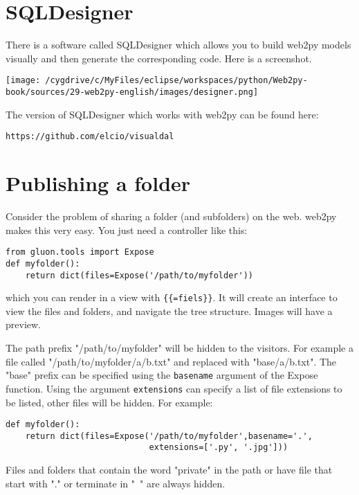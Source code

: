\documentclass[justified,sixbynine,notoc]{tufte-book}
\def\ft{\small\tt}
\begin{document}
\begin{fullwidth}
\goodbreak\section{SQLDesigner}

There is a software called SQLDesigner which allows you to build web2py models visually and then generate the corresponding code. Here is a screenshot.


\goodbreak\begin{center}\texttt{[image: /cygdrive/c/MyFiles/eclipse/workspaces/python/Web2py-book/sources/29-web2py-english/images/designer.png]}\end{center}


The version of SQLDesigner which works with web2py can be found here:

{\ft https://github.com/elcio/visualdal}

\goodbreak\section{Publishing a folder}

Consider the problem of sharing a folder (and subfolders) on the web. web2py makes this very easy. You just need a controller like this:

\begin{lstlisting}
from gluon.tools import Expose
def myfolder():
    return dict(files=Expose('/path/to/myfolder'))
\end{lstlisting}
\noindent which you can render in a view with {\ft \{\{=fiels\}\}}. It will create an interface to view the files and folders, and navigate the tree structure. Images will have a preview.

The path prefix "/path/to/myfolder" will be hidden to the visitors. For example a file called "/path/to/myfolder/a/b.txt" and replaced with "base/a/b.txt". The "base" prefix can be specified using the {\ft basename} argument of the Expose function. Using the argument {\ft extensions} can specify a list of file extensions to be listed, other files will be hidden. For example:

\begin{lstlisting}
def myfolder():
    return dict(files=Expose('/path/to/myfolder',basename='.',
                             extensions=['.py', '.jpg']))
\end{lstlisting}

Files and folders that contain the word "private" in the path or have file that start with "." or terminate in "~" are always hidden.


\end{fullwidth}
\end{document}
